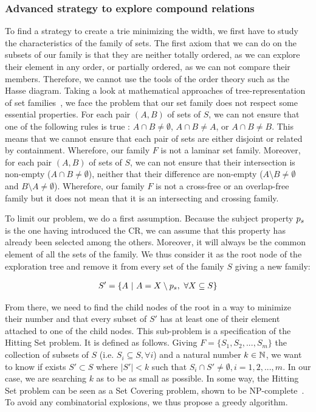 \subsubsection{Advanced strategy to explore compound relations}

To find a strategy to create a trie minimizing the width, we first have to study the characteristics of the family of sets.
The first axiom that we can do on the subsets of our family is that they are neither totally ordered, as we can explore their element in any order, or partially ordered, as we can not compare their members. Therefore, we cannot use the tools of the order theory such as the Hasse diagram. Taking a look at mathematical approaches of tree-representation of set families~\cite{bui_2008_tree}, we face the problem that our set family does not respect some essential properties. For each pair $(A, B)$ of sets of $S$, we can not ensure that one of the following rules is true : $A \cap B \neq \emptyset$, $A \cap B \neq A$, or $A \cap B \neq B$. This means that we cannot ensure that each pair of sets are either disjoint or related by containment. Wherefore, our family $F$ is not a laminar set family.
Moreover, for each pair $(A, B)$ of sets of $S$, we can not ensure that their intersection is non-empty ($A \cap B \neq \emptyset$), neither that their difference are non-empty ($A \setminus B \neq \emptyset$ and $B \setminus A \neq \emptyset$). Wherefore, our family $F$ is not a cross-free or an overlap-free family but it does not mean that it is an intersecting and crossing family.

To limit our problem, we do a first assumption. Because the subject property $p_s$ is the one having introduced the CR, we can assume that this property has already been selected among the others. Moreover, it will always be the common element of all the sets of the family. We thus consider it as the root node of the exploration tree and remove it from every set of the family $S$ giving a new family:

\begin{align*}
S' = \{A\ |\ A = X \setminus p_s,\ \forall X \subseteq S\}
\end{align*}

From there, we need to find the child nodes of the root in a way to minimize their number and that every subset of $S'$ has at least one of their element attached to one of the child nodes. This sub-problem is a specification of the Hitting Set problem. It is defined as follows. Giving $F = \{S_1,S_2,...,S_m\}$ the collection of subsets of $S$ (i.e. $S_i \subseteq S, \forall i$) and a natural number $k \in \mathbb{N}$, we want to know if exists $S' \subset S$ where $|S'| < k$ such that $S_i \cap S' \neq \emptyset, i = 1,2,...,m$. In our case, we are searching $k$ as to be as small as possible. In some way, the Hitting Set problem can be seen as a Set Covering problem, shown to be NP-complete~\cite{karp_1972_reducibility}. To avoid any combinatorial explosions, we thus propose a greedy algorithm.

